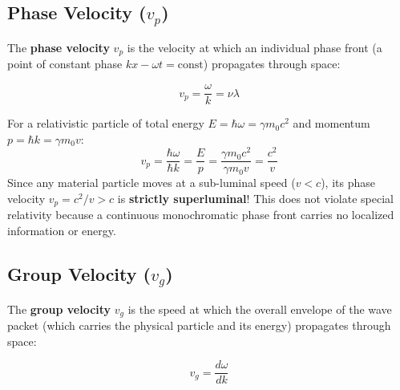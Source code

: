 \subsection{Phase Velocity (\texorpdfstring{$v_p$}{vp})}
The \textbf{phase velocity} $v_p$ is the velocity at which an individual phase front (a point of constant phase $kx - \omega t = \text{const}$) propagates through space:

\begin{keyequation}
\begin{equation}
    v_p = \frac{\omega}{k} = \nu \lambda
\end{equation}
\end{keyequation}
For a relativistic particle of total energy $E = \hbar\omega = \gamma m_0 c^2$ and momentum $p = \hbar k = \gamma m_0 v$:
\begin{equation}
    v_p = \frac{\hbar\omega}{\hbar k} = \frac{E}{p} = \frac{\gamma m_0 c^2}{\gamma m_0 v} = \frac{c^2}{v}
\end{equation}
Since any material particle moves at a sub-luminal speed ($v < c$), its phase velocity $v_p = c^2/v > c$ is \textbf{strictly superluminal}! This does not violate special relativity because a continuous monochromatic phase front carries no localized information or energy.

\subsection{Group Velocity (\texorpdfstring{$v_g$}{vg})}
The \textbf{group velocity} $v_g$ is the speed at which the overall envelope of the wave packet (which carries the physical particle and its energy) propagates through space:

\begin{keyequation}
\begin{equation}
    v_g = \frac{d\omega}{dk}
\end{equation}
\end{keyequation}


